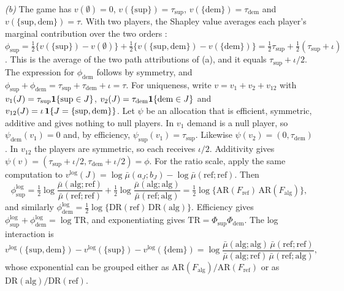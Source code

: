 \emph{(b)} The game has $v(\emptyset)=0$, $v(\{\mathrm{sup}\})=\tau_{\mathrm{sup}}$, $v(\{\mathrm{dem}\})=\tau_{\mathrm{dem}}$ and $v(\{\mathrm{sup},\mathrm{dem}\})=\tau$. With two players, the Shapley value averages each player's marginal contribution over the two orders \citep{shapley1953}:
$\phi_{\mathrm{sup}}=\frac12\{v(\{\mathrm{sup}\})-v(\emptyset)\}+\frac12\{v(\{\mathrm{sup},\mathrm{dem}\})-v(\{\mathrm{dem}\})\}=\frac12\tau_{\mathrm{sup}}+\frac12(\tau_{\mathrm{sup}}+\iota)$. This is the average of the two path attributions of (a), and it equals $\tau_{\mathrm{sup}}+\iota/2$. The expression for $\phi_{\mathrm{dem}}$ follows by symmetry, and $\phi_{\mathrm{sup}}+\phi_{\mathrm{dem}}=\tau_{\mathrm{sup}}+\tau_{\mathrm{dem}}+\iota=\tau$.
For uniqueness, write $v=v_1+v_2+v_{12}$ with $v_1(J)=\tau_{\mathrm{sup}}\mathbf{1}\!\left\{\mathrm{sup}\in J\right\}$, $v_2(J)=\tau_{\mathrm{dem}}\mathbf{1}\!\left\{\mathrm{dem}\in J\right\}$ and $v_{12}(J)=\iota\,\mathbf{1}\!\left\{J=\{\mathrm{sup},\mathrm{dem}\}\right\}$. Let $\psi$ be an allocation that is efficient, symmetric, additive and gives nothing to null players. In $v_1$ demand is a null player, so $\psi_{\mathrm{dem}}(v_1)=0$ and, by efficiency, $\psi_{\mathrm{sup}}(v_1)=\tau_{\mathrm{sup}}$. Likewise $\psi(v_2)=(0,\tau_{\mathrm{dem}})$. In $v_{12}$ the players are symmetric, so each receives $\iota/2$. Additivity gives $\psi(v)=(\tau_{\mathrm{sup}}+\iota/2,\tau_{\mathrm{dem}}+\iota/2)=\phi$.
For the ratio scale, apply the same computation to $v^{\log}(J)=\log\bar\mu(a_J;b_J)-\log\bar\mu(\mathrm{ref};\mathrm{ref})$. Then
\[
  \phi^{\log}_{\mathrm{sup}}=\tfrac12\log\frac{\bar\mu(\mathrm{alg};\mathrm{ref})}{\bar\mu(\mathrm{ref};\mathrm{ref})}+\tfrac12\log\frac{\bar\mu(\mathrm{alg};\mathrm{alg})}{\bar\mu(\mathrm{ref};\mathrm{alg})}
  =\tfrac12\log\{\mathrm{AR}(F_{\mathrm{ref}})\,\mathrm{AR}(F_{\mathrm{alg}})\},
\]
and similarly $\phi^{\log}_{\mathrm{dem}}=\frac12\log\{\mathrm{DR}(\mathrm{ref})\,\mathrm{DR}(\mathrm{alg})\}$. Efficiency gives $\phi^{\log}_{\mathrm{sup}}+\phi^{\log}_{\mathrm{dem}}=\log\mathrm{TR}$, and exponentiating gives $\mathrm{TR}=\Phi_{\mathrm{sup}}\Phi_{\mathrm{dem}}$. The log interaction is
\[
  v^{\log}(\{\mathrm{sup},\mathrm{dem}\})-v^{\log}(\{\mathrm{sup}\})-v^{\log}(\{\mathrm{dem}\})
  =\log\frac{\bar\mu(\mathrm{alg};\mathrm{alg})\,\bar\mu(\mathrm{ref};\mathrm{ref})}{\bar\mu(\mathrm{alg};\mathrm{ref})\,\bar\mu(\mathrm{ref};\mathrm{alg})},
\]
whose exponential can be grouped either as $\mathrm{AR}(F_{\mathrm{alg}})/\mathrm{AR}(F_{\mathrm{ref}})$ or as $\mathrm{DR}(\mathrm{alg})/\mathrm{DR}(\mathrm{ref})$.


